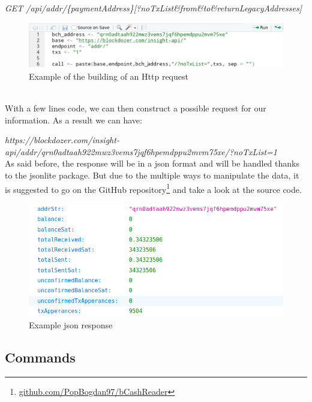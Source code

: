 \textit{GET /api/addr/\{paymentAddress\}[?noTxList\&from\&to\&returnLegacyAddresses]}
\\
\begin{figure}[h]
    \centering
    \includegraphics[height=2cm]{create_call.png}
    \caption{Example of the building of an Http request}
    \label{fig:request}
\end{figure}\\
With a few lines code, we can then construct a possible request for our information. 
As a result we can have:\medskip

\textit{https://blockdozer.com/insight-api/addr/qrn0adtaah922mwz3vems7jqf6hpemdppu2mvm75xe/?noTxList=1}
\medskip\\
As said before, the response will be in a json format and will be handled thanks to the
jsonlite package. But due to the multiple ways to manipulate the data, it is 
suggested to go on the GitHub repository\footnote{\url{github.com/PopBogdan97/bCashReader}} and take a look at the source code.
\begin{figure}[h]
    \centering
    \includegraphics[height=5cm]{json_sample.png}
    \caption{Example json response}
    \label{fig:response}
\end{figure}\pagebreak


\subsection{Commands}
\label{sec:commands}


